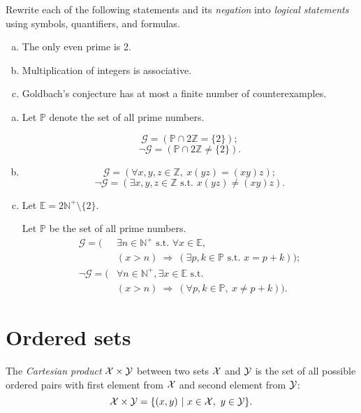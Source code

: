 \begin{exc}
  Rewrite each of the following
  statements and its \emph{negation}
  into \emph{logical statements}
  using symbols, quantifiers, and formulas.
  \begin{enumerate}[(a)]\itemsep0em
  \item The only even prime is 2.
  \item Multiplication of integers is associative.
  \item Goldbach's conjecture has
    at most a finite number of counterexamples.
  \end{enumerate}  
\end{exc}
\begin{solution}
\begin{enumerate}[(a)]
\item Let $\mathbb{P}$ denote the set of all prime numbers.

\[
\mathcal{G}=(\mathbb{P}\cap 2\mathbb{Z}=\{2\});
\]
\[
\neg\mathcal{G}=(\mathbb{P}\cap 2\mathbb{Z}\ne\{2\}).
\]

\item\[
\mathcal{G}=(\forall x,y,z \in \mathbb{Z},\  x(yz)=(xy)z);
\]
\[
\neg\mathcal{G}=(\exists x,y,z \in \mathbb{Z}\text{ s.t. } x(yz)\neq(xy)z).
\]
\item Let $\mathbb{E}= 2\mathbb{N^+}\setminus \{2\}$.

Let $\mathbb{P}$ be the set of all prime numbers.
\begin{align*}
\mathcal{G} =\bigl(&\exists n\in\mathbb{N}^+\text{ s.t. }
 \forall x\in\mathbb{E},\\  
 &(x>n)\ \Rightarrow\ (\exists p,k\in\mathbb{P}\text{ s.t. } x= p+k)
 \bigr);  \\
\neg\mathcal{G} =\bigl(&\forall n\in\mathbb{N}^+,
 \exists x\in\mathbb{E}\text{ s.t. } \\
 &(x>n)\ \Rightarrow\ (\forall p,k\in\mathbb{P},\  x\ne p+k)
 \bigr).
\end{align*}
\end{enumerate}
\end{solution}


\section{Ordered sets}
\label{sec:sets}

\begin{defn}
  \label{def:CartesianProduct}
  The \emph{Cartesian product} ${\cal X}\times {\cal Y}$
   between two sets ${\cal X}$ and ${\cal Y}$
   is the set of all possible ordered pairs with first element
   from ${\cal X}$ and second element from ${\cal Y}$:
   \begin{equation}
     {\cal X}\times {\cal Y} = \{(x,y)\ |\ x\in {\cal X},\ y\in {\cal Y}\}.
   \end{equation}
\end{defn}

